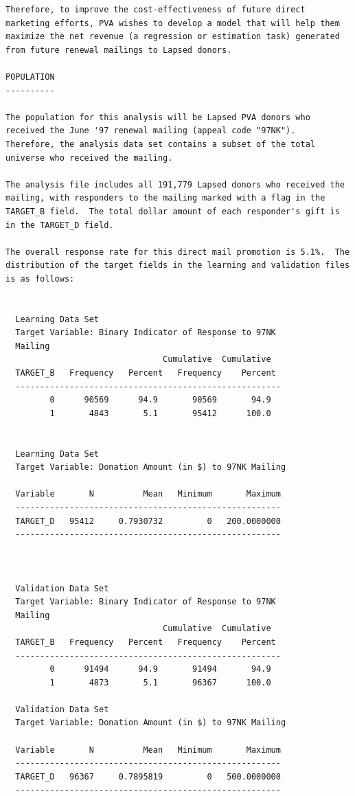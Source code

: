 \documentclass[
  11pt,
  a4paper,
  DIV=12,captions=tableheading,oneside,titlepage]{scrbook}
\begin{document}
\begin{verbatim}
Therefore, to improve the cost-effectiveness of future direct
marketing efforts, PVA wishes to develop a model that will help them
maximize the net revenue (a regression or estimation task) generated
from future renewal mailings to Lapsed donors.

POPULATION
----------

The population for this analysis will be Lapsed PVA donors who
received the June '97 renewal mailing (appeal code "97NK").
Therefore, the analysis data set contains a subset of the total
universe who received the mailing.

The analysis file includes all 191,779 Lapsed donors who received the
mailing, with responders to the mailing marked with a flag in the
TARGET_B field.  The total dollar amount of each responder's gift is
in the TARGET_D field.

The overall response rate for this direct mail promotion is 5.1%.  The
distribution of the target fields in the learning and validation files
is as follows:


  Learning Data Set
  Target Variable: Binary Indicator of Response to 97NK 
  Mailing
                                Cumulative  Cumulative
  TARGET_B   Frequency   Percent   Frequency    Percent
  ------------------------------------------------------
         0      90569      94.9       90569       94.9
         1       4843       5.1       95412      100.0


  Learning Data Set
  Target Variable: Donation Amount (in $) to 97NK Mailing   

  Variable       N          Mean   Minimum       Maximum 
  ------------------------------------------------------ 
  TARGET_D   95412     0.7930732         0   200.0000000 
  ------------------------------------------------------ 



  Validation Data Set 
  Target Variable: Binary Indicator of Response to 97NK 
  Mailing
                                Cumulative  Cumulative
  TARGET_B   Frequency   Percent   Frequency    Percent
  ------------------------------------------------------
         0      91494      94.9       91494       94.9
         1       4873       5.1       96367      100.0

  Validation Data Set 
  Target Variable: Donation Amount (in $) to 97NK Mailing 

  Variable       N          Mean   Minimum       Maximum
  ------------------------------------------------------
  TARGET_D   96367     0.7895819         0   500.0000000
  ------------------------------------------------------



\end{verbatim}
\end{document}
